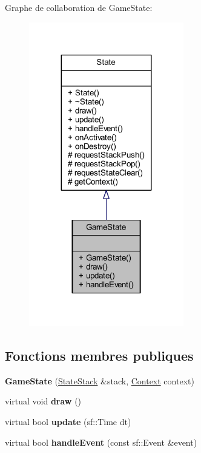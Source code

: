 Graphe de collaboration de Game\+State\+:\nopagebreak
\begin{figure}[H]
\begin{center}
\leavevmode
\includegraphics[width=191pt]{class_game_state__coll__graph}
\end{center}
\end{figure}
\subsection*{Fonctions membres publiques}
\begin{DoxyCompactItemize}
\item 
\hypertarget{class_game_state_aeb2e2598754640c694b989311b1aebfe}{}\label{class_game_state_aeb2e2598754640c694b989311b1aebfe} 
{\bfseries Game\+State} (\hyperlink{class_state_stack}{State\+Stack} \&stack, \hyperlink{struct_state_1_1_context}{Context} context)
\item 
\hypertarget{class_game_state_a3c511417d8934943ae65c04681f321a3}{}\label{class_game_state_a3c511417d8934943ae65c04681f321a3} 
virtual void {\bfseries draw} ()
\item 
\hypertarget{class_game_state_a4ac988f0da5c33b43ff356890fcf9c1c}{}\label{class_game_state_a4ac988f0da5c33b43ff356890fcf9c1c} 
virtual bool {\bfseries update} (sf\+::\+Time dt)
\item 
\hypertarget{class_game_state_a000dd3306b1cb9faab5a86774a22aa6d}{}\label{class_game_state_a000dd3306b1cb9faab5a86774a22aa6d} 
virtual bool {\bfseries handle\+Event} (const sf\+::\+Event \&event)
\end{DoxyCompactItemize}
